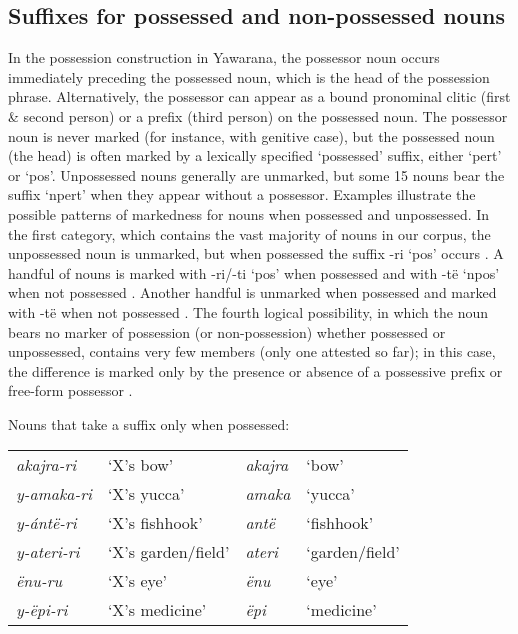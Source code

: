 \documentclass{memoir}
\begin{document}
\subsection{\texorpdfstring{Suffixes for possessed and non-possessed
nouns
\label{sec:nounposssuf}}{Suffixes for possessed and non-possessed nouns }}

In the possession construction in Yawarana, the possessor noun occurs
immediately preceding the possessed noun, which is the head of the
possession phrase. Alternatively, the possessor can appear as a bound
pronominal clitic (first \& second person) or a prefix (third person) on
the possessed noun. The possessor noun is never marked (for instance,
with genitive case), but the possessed noun (the head) is often marked
by a lexically specified `possessed' suffix, either  `pert' or
 `pos'. Unpossessed nouns generally are unmarked, but some 15
nouns bear the suffix  `npert' when they appear without a
possessor. Examples  illustrate
the possible patterns of markedness for nouns when possessed and
unpossessed. In the first category, which contains the vast majority of
nouns in our corpus, the unpossessed noun is unmarked, but when
possessed the suffix -ri `pos' occurs . A handful
of nouns is marked with -ri/-ti `pos' when possessed and with -të `npos'
when not possessed . Another handful is unmarked
when possessed and marked with -të when not possessed
. The fourth logical possibility, in which the
noun bears no marker of possession (or non-possession) whether possessed
or unpossessed, contains very few members (only one attested so far); in
this case, the difference is marked only by the presence or absence of a
possessive prefix or free-form possessor .

\ex\label{onlypossessed} Nouns that take a suffix only when possessed:

\begin{tabular}[t]{llll}

 \emph{akajra-ri} &          ‘X’s bow’ & \emph{akajra} &          ‘bow’ \\

\emph{y-amaka-ri} &        ‘X’s yucca’ &  \emph{amaka} &        ‘yucca’ \\
 \emph{y-ántë-ri} &     ‘X’s fishhook’ &   \emph{antë} &     ‘fishhook’ \\
\emph{y-ateri-ri} & ‘X’s garden/field’ &  \emph{ateri} & ‘garden/field’ \\
    \emph{ënu-ru} &          ‘X’s eye’ &    \emph{ënu} &          ‘eye’ \\
  \emph{y-ëpi-ri} &     ‘X’s medicine’ &    \emph{ëpi} &     ‘medicine’ \\

\end{tabular}
 \xe
\end{document}
